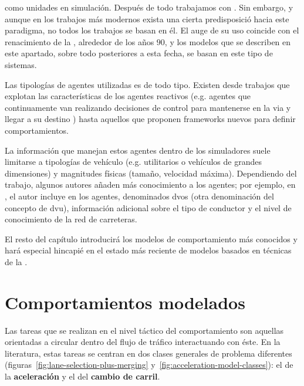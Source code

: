  como unidades en simulación. Después de todo trabajamos con . Sin embargo, y aunque en los trabajos más modernos exista una cierta predisposició hacia este paradigma, no todos los trabajos se basan en él. El auge de su uso coincide con el renacimiento de la , alrededor de los años $90$, y los modelos que se describen en este apartado, sobre todo posteriores a esta fecha, se basan en este tipo de sistemas.

Las tipologías de agentes utilizadas es de todo tipo. Existen desde trabajos que explotan las características de los agentes reactivos (e.g. agentes que continuamente van realizando decisiones de control para mantenerse en la via y llegar a su destino \cite{Ehlert2001}) hasta aquellos que proponen frameworks nuevos para definir comportamientos.

La información que manejan estos agentes dentro de los simuladores suele limitarse a tipologías de vehículo (e.g. utilitarios o vehículos de grandes dimensiones) y magnitudes físicas (tamaño, velocidad máxima). Dependiendo del trabajo, algunos autores añaden más conocimiento a los agentes; por ejemplo, en \cite{hidas2002}, el autor incluye en los agentes, denominados \glspl{dvo} (otra denominación del concepto de \gls{dvu}), información adicional sobre el tipo de conductor y el nivel de conocimiento de la red de carreteras.

El resto del capítulo introducirá los modelos de comportamiento más conocidos y hará especial hincapié en el estado más reciente de modelos basados en técnicas de la .

\section{Comportamientos modelados}

Las tareas que se realizan en el nivel táctico del comportamiento son aquellas orientadas a circular dentro del flujo de tráfico interactuando con éste. En la literatura, estas tareas se centran en dos clases generales de problema diferentes (figuras~\ref{fig:lane-selection-plus-merging} y~\ref{fig:acceleration-model-classes}): el de la \textbf{aceleración} y el del \textbf{cambio de carril}.

